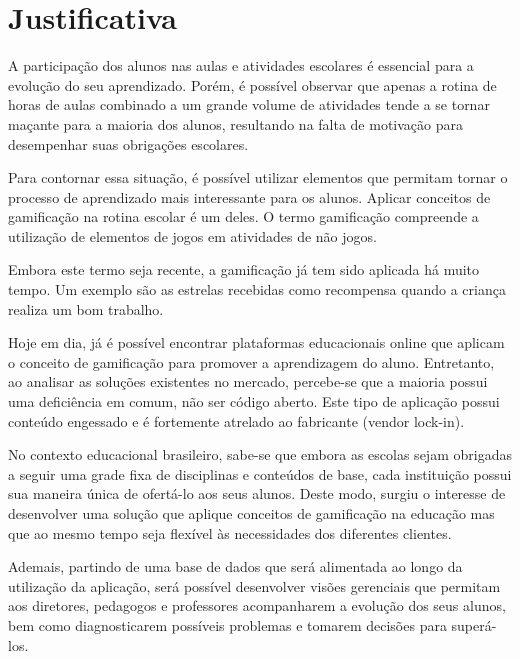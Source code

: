 \chapter{Justificativa}
A participação dos alunos nas aulas e atividades escolares é essencial para a evolução do seu aprendizado. Porém, é possível observar que apenas a rotina de horas de aulas combinado a um grande volume de atividades tende a se tornar maçante para a maioria dos alunos, resultando na falta de motivação para desempenhar suas obrigações escolares.

Para contornar essa situação, é possível utilizar elementos que permitam tornar o processo de aprendizado mais interessante para os alunos.  Aplicar conceitos de gamificação na rotina escolar é um deles. O termo gamificação compreende a utilização de elementos de jogos em atividades de não jogos. 

Embora este termo seja recente, a gamificação já tem sido aplicada há muito tempo. Um exemplo são as estrelas recebidas como recompensa quando a criança realiza um bom trabalho.

Hoje em dia, já é possível encontrar plataformas educacionais online que aplicam o conceito de gamificação para promover a aprendizagem do aluno. Entretanto, ao analisar as soluções existentes no mercado, percebe-se que a maioria possui uma deficiência em comum, não ser código aberto. Este tipo de aplicação possui conteúdo engessado e é fortemente atrelado ao fabricante (vendor lock-in). 

No contexto educacional brasileiro, sabe-se que embora as escolas sejam obrigadas a seguir uma grade fixa de disciplinas e conteúdos de base, cada instituição possui sua maneira única de ofertá-lo aos seus alunos. Deste modo, surgiu o interesse de desenvolver uma solução que aplique conceitos de gamificação na educação mas que ao mesmo tempo seja flexível às necessidades dos diferentes clientes. 

Ademais, partindo de uma base de dados que será alimentada ao longo da utilização da aplicação, será possível desenvolver visões gerenciais que permitam aos diretores, pedagogos e professores acompanharem a evolução dos seus alunos, bem como diagnosticarem possíveis problemas e tomarem decisões para superá-los.